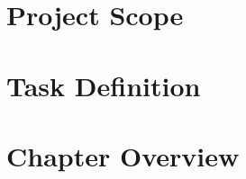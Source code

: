 \section*{Project Scope} \addtocounter{section}{1}
	
	\label{sec:1-scope}
	
\section*{Task Definition} \addtocounter{section}{1}
	
	\label{sec:1-task}
	
\section*{Chapter Overview} \addtocounter{section}{1}
	
	\label{sec:1-chapters}